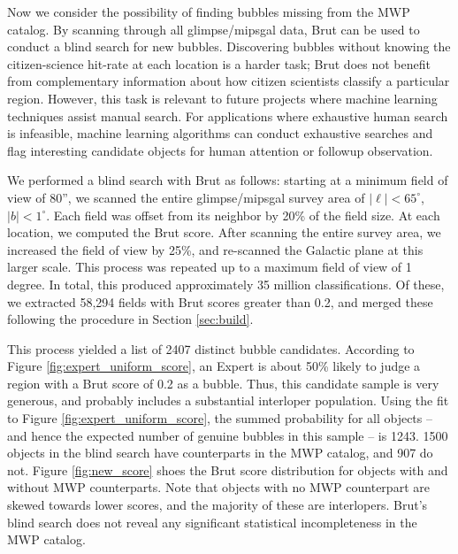 \documentclass[preprint]{aastex}
\begin{document}
Now we consider the possibility of finding bubbles missing from the MWP catalog. By scanning through all {\sc glimpse}/{\sc mipsgal} data, Brut can be used to conduct a blind search for new bubbles. Discovering bubbles without knowing the citizen-science hit-rate at each location is a harder task; Brut does not benefit from complementary information about how citizen scientists classify a particular region. However, this task is relevant to future projects where machine learning techniques assist manual search. For applications where exhaustive human search is infeasible, machine learning algorithms can conduct exhaustive searches and flag interesting candidate objects for human attention or followup observation.

We performed a blind search with Brut as follows: starting at a minimum field of view of 80'', we scanned the entire {\sc glimpse}/{\sc mipsgal} survey area of $|\ell| < 65^\circ$, $|b| < 1^\circ$. Each field was offset from its neighbor by 20\% of the field size. At each location, we computed the Brut score. After scanning the entire survey area, we increased the field of view by 25\%, and re-scanned the Galactic plane at this larger scale. This process was repeated up to a maximum field of view of 1 degree. In total, this produced approximately 35 million classifications. Of these, we extracted 58,294 fields with Brut scores greater than 0.2, and merged these following the procedure in Section \ref{sec:build}. 

This process yielded a list of 2407 distinct bubble candidates. According to Figure \ref{fig:expert_uniform_score}, an Expert is about 50\% likely to judge a region with a Brut score of 0.2 as a bubble. Thus, this candidate sample is very generous, and probably includes a substantial interloper population. Using the fit to Figure \ref{fig:expert_uniform_score}, the summed probability for all objects -- and hence the expected number of genuine bubbles in this sample -- is 1243. 1500 objects in the blind search have counterparts in the MWP catalog, and 907 do not. Figure \ref{fig:new_score} shoes the Brut score distribution for objects with and without MWP counterparts. Note that objects with no MWP counterpart are skewed towards lower scores, and the majority of these are interlopers. Brut's blind search does not reveal any significant statistical incompleteness in the MWP catalog.
\end{document}

